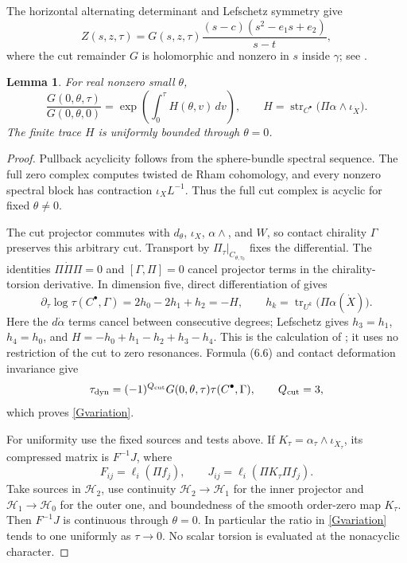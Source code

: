 \documentclass[11pt]{article}
\newtheorem{lemma}[theorem]{Lemma}
\newcommand{\tr}{\operatorname{tr}}
\newcommand{\str}{\operatorname{str}}
\begin{document}
The horizontal alternating determinant and Lefschetz symmetry give
\begin{equation}\label{divisor}
 Z(s,z,\tau)=G(s,z,\tau)
          \frac{(s-c)(s^2-e_1s+e_2)}{s-t},
\end{equation}
where the cut remainder $G$ is holomorphic and nonzero in $s$ inside
$\gamma$; see \cite[(6.4)--(6.5)]{CD}.

\begin{lemma}\label{normalization}
For real nonzero small $\theta$,
\begin{equation}\label{Gvariation}
 \frac{G(0,\theta,\tau)}{G(0,\theta,0)}
   =\exp\left(\int_0^\tau H(\theta,v)\,dv\right),\qquad
 H=\str_{C^\bullet}\bigl(\Pi\alpha\wedge\iota_{\dot X}\bigr).
\end{equation}
The finite trace $H$ is uniformly bounded through $\theta=0$.
\end{lemma}
\begin{proof}
Pullback acyclicity follows from the sphere-bundle spectral sequence.
The full zero complex computes twisted de Rham cohomology, and every
nonzero spectral block has contraction $\iota_XL^{-1}$. Thus the full
cut complex is acyclic for fixed $\theta\ne0$.

The cut projector commutes with $d_\theta$, $\iota_X$, $\alpha\wedge$,
and $W$, so contact chirality $\Gamma$ preserves this arbitrary cut.
Transport by $\Pi_\tau|_{C_{\theta,\tau_0}}$ fixes the differential.
The identities $\Pi\dot\Pi\Pi=0$ and $[\Gamma,\Pi]=0$ cancel projector
terms in the chirality-torsion derivative. In dimension five, direct
differentiation of \cite[Definition 6.1]{CD} gives
\[
 \partial_\tau\log\tau(C^\bullet,\Gamma)
       =2h_0-2h_1+h_2=-H,\qquad
 h_k=\tr_{U^k}\bigl(\Pi\alpha(\dot X)\bigr).
\]
Here the $d\dot\alpha$ terms cancel between consecutive degrees;
Lefschetz gives $h_3=h_1$, $h_4=h_0$, and
$H=-h_0+h_1-h_2+h_3-h_4$. This is the calculation of
\cite[Lemma 7.3]{CD}; it uses no restriction of the cut to zero
resonances. Formula (6.6) and contact deformation invariance give
\[
 \tau_{\rm dyn}=(-1)^{Q_{\rm cut}}G(0,\theta,\tau)
                    \tau(C^\bullet,\Gamma),\qquad Q_{\rm cut}=3,
\]
which proves \eqref{Gvariation}.

For uniformity use the fixed sources and tests above. If
$K_\tau=\alpha_\tau\wedge\iota_{\dot X_\tau}$, its compressed matrix
is $F^{-1}J$, where
\[
 F_{ij}=\ell_i(\Pi f_j),\qquad
 J_{ij}=\ell_i(\Pi K_\tau\Pi f_j).
\]
Take sources in $\mathcal H_2$, use continuity
$\mathcal H_2\to\mathcal H_1$ for the inner projector and
$\mathcal H_1\to\mathcal H_0$ for the outer one, and boundedness of the
smooth order-zero map $K_\tau$. Then $F^{-1}J$ is continuous through
$\theta=0$. In particular the ratio in \eqref{Gvariation} tends to one
uniformly as $\tau\to0$. No scalar torsion is evaluated at the
nonacyclic character.
\end{proof}
\end{document}
